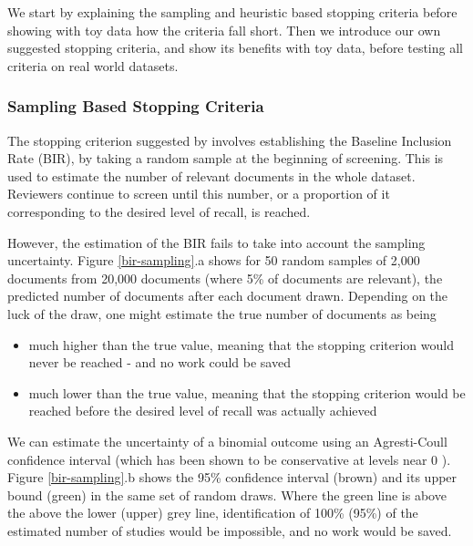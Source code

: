 \documentclass{bmcart}
\begin{document}
	We start by explaining the sampling and heuristic based stopping criteria before showing with toy data how the criteria fall short. 
	Then we introduce our own suggested stopping criteria, and show its benefits with toy data, before testing all criteria on real world datasets.
	
	\subsubsection*{Sampling Based Stopping Criteria}
	
	The stopping criterion suggested by \cite{Shemilt2014} involves establishing the Baseline Inclusion Rate (BIR), by taking a random sample at the beginning of screening. 
	This is used to estimate the number of relevant documents in the whole dataset. 
	Reviewers continue to screen until this number, or a proportion of it corresponding to the desired level of recall, is reached.
	

	
	However, the estimation of the BIR fails to take into account the sampling uncertainty. 
	Figure \ref{bir-sampling}.a shows for 50 random samples of 2,000 documents from 20,000 documents (where 5\% of documents are relevant), the predicted number of documents after each document drawn. 
	Depending on the luck of the draw, one might estimate the true number of documents as being
	\begin{itemize}
		\item much higher than the true value, meaning that the stopping criterion would never be reached - and no work could be saved
		\item much lower than the true value, meaning that the stopping criterion would be reached before the desired level of recall was actually achieved
	\end{itemize}
	
	We can estimate the uncertainty of a binomial outcome using an Agresti-Coull confidence interval (which has been shown to be conservative at levels near 0  \cite{Brown2001}). 
	Figure \ref{bir-sampling}.b shows the 95\% confidence interval (brown) and its upper bound (green) in the same set of random draws. 
	Where the green line is above the above the lower (upper) grey line, identification of 100\% (95\%) of the estimated number of studies would be impossible, and no work would be saved.
	
\end{document}
